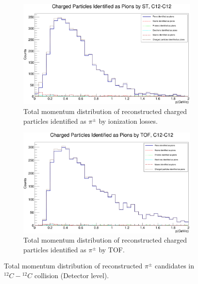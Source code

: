 \documentclass[12pt]{article}
\begin{document}
\begin{figure}[h]
\vspace{0.3cm}
	\centering
    \begin{subfigure}[h]{0.49\textwidth}
		\centering
		\includegraphics[scale=0.14]{Detector_pToT_pions(st)_C12.png}
		\caption{Total momentum distribution of reconstructed charged particles identified as $\pi^{\pm}$ by ionization losses.}
		\label{sim-p-pions-dedx}
	\end{subfigure}
	\hfill
	\begin{subfigure}[h]{0.49\textwidth}
		\centering
		\includegraphics[scale=0.14]{Detector_pToT_pions(tof)_C12.png}
		\caption{Total momentum distribution of reconstructed charged particles identified as $\pi^{\pm}$ by TOF.}
		\label{sim-p-pions-tof}
	\end{subfigure}
	\caption{Total momentum distribution of reconstructed $\pi^\pm$ candidates in $^{12}C-{^{12}C}$ collision (Detector level).}
	\label{sim-p-pions}
\end{figure}
\end{document}
